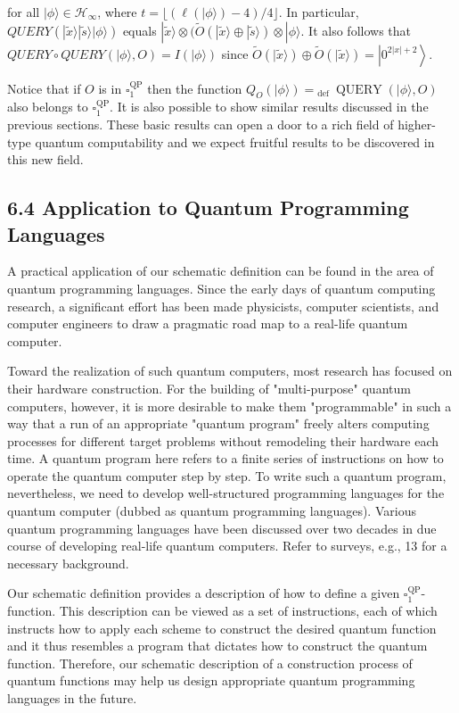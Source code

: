 \documentclass[10pt]{article}
\begin{document}
for all $|\phi\rangle \in \mathcal{H}_{\infty}$, where $t=\lfloor(\ell(|\phi\rangle)-4) / 4\rfloor$. In particular, $Q U E R Y(|\tilde{x}\rangle|\tilde{s}\rangle|\phi\rangle)$ equals $|\tilde{x}\rangle \otimes(\tilde{O}(|\tilde{x}\rangle \oplus|\tilde{s}\rangle) \otimes|\phi\rangle$. It also follows that $Q U E R Y \circ Q U E R Y(|\phi\rangle, O)=I(|\phi\rangle)$ since $\tilde{O}(|\tilde{x}\rangle) \oplus \tilde{O}(|\tilde{x}\rangle)=\left|0^{2|x|+2}\right\rangle$.

Notice that if $O$ is in $\square_{1}^{\mathrm{QP}}$ then the function $Q_{O}(|\phi\rangle)={ }_{\text {def }} \operatorname{QUERY}(|\phi\rangle, O)$ also belongs to $\square_{1}^{\mathrm{QP}}$. It is also possible to show similar results discussed in the previous sections. These basic results can open a door to a rich field of higher-type quantum computability and we expect fruitful results to be discovered in this new field.

\subsection*{6.4 Application to Quantum Programming Languages}
A practical application of our schematic definition can be found in the area of quantum programming languages. Since the early days of quantum computing research, a significant effort has been made physicists, computer scientists, and computer engineers to draw a pragmatic road map to a real-life quantum computer.

Toward the realization of such quantum computers, most research has focused on their hardware construction. For the building of "multi-purpose" quantum computers, however, it is more desirable to make them "programmable" in such a way that a run of an appropriate "quantum program" freely alters computing processes for different target problems without remodeling their hardware each time. A quantum program here refers to a finite series of instructions on how to operate the quantum computer step by step. To write such a quantum program, nevertheless, we need to develop well-structured programming languages for the quantum computer (dubbed as quantum programming languages). Various quantum programming languages have been discussed over two decades in due course of developing real-life quantum computers. Refer to surveys, e.g., 13 for a necessary background.

Our schematic definition provides a description of how to define a given $\square_{1}^{\mathrm{QP}}$-function. This description can be viewed as a set of instructions, each of which instructs how to apply each scheme to construct the desired quantum function and it thus resembles a program that dictates how to construct the quantum function. Therefore, our schematic description of a construction process of quantum functions may help us design appropriate quantum programming languages in the future.
\end{document}

